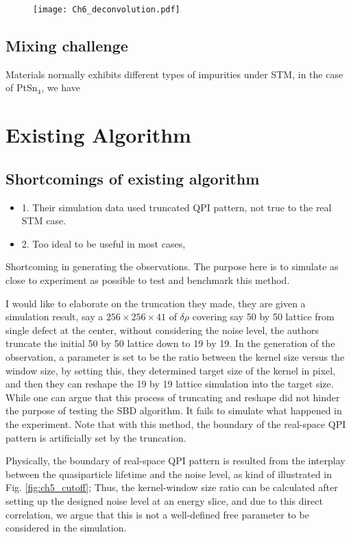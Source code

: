 \begin{figure}
	\texttt{[image: Ch6\_deconvolution.pdf]} 
	\centering
	\caption{}
	\label{fig:ch6_decon}
\end{figure}

\subsection{Mixing challenge}
Materials normally exhibits different types of impurities under STM, in the case of PtSn$_4$, we have 


\section{Existing Algorithm}
\subsection{Shortcomings of existing algorithm}
\begin{itemize}
	\item 1. Their simulation data used truncated QPI pattern, not true to the real STM case. 
	\item 2. Too ideal to be useful in most cases,
\end{itemize}

Shortcoming in generating the observations. The purpose here is to simulate as close to experiment as possible to test and benchmark this method. 

I would like to elaborate on the truncation they made, they are given a simulation result, say a $256\times256\times41$ of $\delta\rho$ covering say 50 by 50 lattice from single defect at the center, without considering the noise level, the authors truncate the initial 50 by 50 lattice down to 19 by 19. In the generation of the observation, a parameter is set to be the ratio between the kernel size versus the window size, by setting this, they determined target size of the kernel in pixel, and then they can reshape the 19 by 19 lattice simulation into the target size. While one can argue that this process of truncating and reshape did not hinder the purpose of testing the SBD algorithm. It fails to simulate what happened in the experiment. Note that with this method, the boundary of the real-space QPI pattern is artificially set by the truncation.

Physically, the boundary of real-space QPI pattern is resulted from the interplay between the quasiparticle lifetime and the noise level, as kind of illustrated in Fig. \ref{fig:ch5_cutoff}; Thus, the kernel-window size ratio can be calculated after setting up the designed noise level at an energy slice, and due to this direct correlation, we argue that this is not a well-defined free parameter to be considered in the simulation. 

